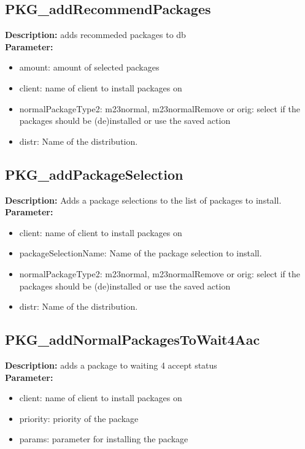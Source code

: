 \subsection{PKG\_addRecommendPackages}
\textbf{Description:} adds recommeded packages to db\\
\textbf{Parameter:}
\begin{itemize}
\item amount: amount of selected packages
\item client: name of client to install packages on
\item normalPackageType2: m23normal, m23normalRemove or orig: select if the packages should be (de)installed or use the saved action
\item distr: Name of the distribution.
\end{itemize}

\subsection{PKG\_addPackageSelection}
\textbf{Description:} Adds a package selections to the list of packages to install.\\
\textbf{Parameter:}
\begin{itemize}
\item client: name of client to install packages on
\item packageSelectionName: Name of the package selection to install.
\item normalPackageType2: m23normal, m23normalRemove or orig: select if the packages should be (de)installed or use the saved action
\item distr: Name of the distribution.
\end{itemize}

\subsection{PKG\_addNormalPackagesToWait4Aac}
\textbf{Description:} adds a package to waiting 4 accept status\\
\textbf{Parameter:}
\begin{itemize}
\item client: name of client to install packages on
\item priority: priority of the package
\item params: parameter for installing the package
\end{itemize}

